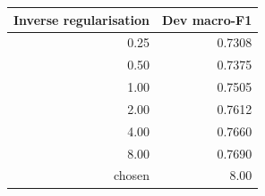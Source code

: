 \begingroup\small\setlength{\tabcolsep}{4pt}
\begin{tabular}{rr}
\toprule
\textbf{Inverse regularisation} & \textbf{Dev macro-F1} \\  %
\midrule
0.25 & 0.7308 \\  %
0.50 & 0.7375 \\  %
1.00 & 0.7505 \\  %
2.00 & 0.7612 \\  %
4.00 & 0.7660 \\  %
8.00 & 0.7690 \\  %
\midrule
chosen & 8.00 \\  %
\bottomrule
\end{tabular}
\endgroup
\par\smallskip{}
